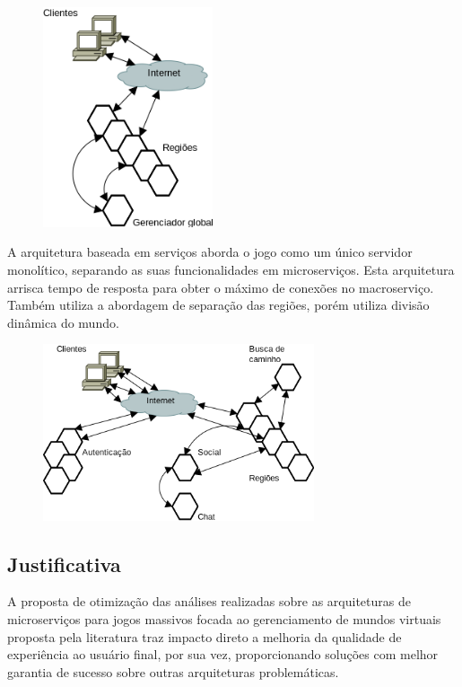 \begin{figure}[H]
  \includegraphics[width=5cm]{arquiteturas/regioes.png}
  \centering
\end{figure}

A arquitetura baseada em serviços\cite{stephenclarkewillson2017} aborda o jogo como um único servidor monolítico, separando as suas funcionalidades em microserviços. Esta arquitetura arrisca tempo de resposta para obter o máximo de conexões no macroserviço. Também utiliza a abordagem de separação das regiões, porém utiliza divisão dinâmica do mundo.

\begin{figure}[H]
  \includegraphics[width=8cm]{arquiteturas/servicos.png}
  \centering
\end{figure}

\subsection{Justificativa}

A proposta de otimização das análises realizadas sobre as arquiteturas de microserviços para jogos massivos focada ao gerenciamento de mundos virtuais proposta pela literatura traz impacto direto a melhoria da qualidade de experiência ao usuário final, por sua vez, proporcionando soluções com melhor garantia de sucesso sobre outras arquiteturas problemáticas.
